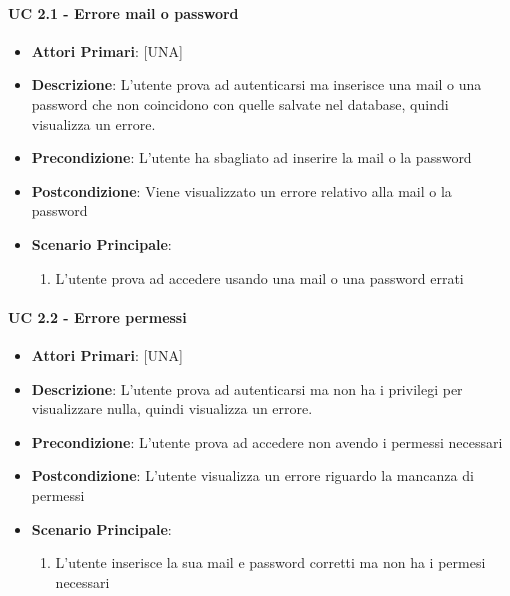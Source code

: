 			\paragraph{UC 2.1 - Errore mail o password}
			\begin{itemize}
				\item \textbf{Attori Primari}: [UNA]
				\item \textbf{Descrizione}: L'utente prova ad autenticarsi ma inserisce una mail o una password che non coincidono con quelle salvate nel database, quindi visualizza un errore.
				\item \textbf{Precondizione}: L'utente ha sbagliato ad inserire la mail o la password
				\item \textbf{Postcondizione}: Viene visualizzato un errore relativo alla mail o la password
				\item \textbf{Scenario Principale}:
				\begin{enumerate}
					\item{L'utente prova ad accedere usando una mail o una password errati}
				\end{enumerate}	
			\end{itemize}

			\paragraph{UC 2.2 - Errore permessi}
			\begin{itemize}
				\item \textbf{Attori Primari}: [UNA]
				\item \textbf{Descrizione}: L'utente prova ad autenticarsi ma non ha i privilegi per visualizzare nulla, quindi visualizza un errore.
				\item \textbf{Precondizione}: L'utente prova ad accedere non avendo i permessi necessari
				\item \textbf{Postcondizione}: L'utente visualizza un errore riguardo la mancanza di permessi
				\item \textbf{Scenario Principale}:
				\begin{enumerate}
					\item{L'utente inserisce la sua mail e password corretti ma non ha i permesi necessari}
				\end{enumerate}	
			\end{itemize}

